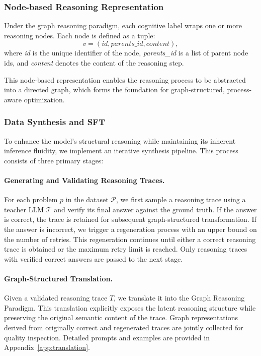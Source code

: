 \subsubsection{Node-based Reasoning Representation}
\label{sec:nodes}

Under the graph reasoning paradigm, each cognitive label wraps one or more reasoning nodes.
Each node is defined as a tuple:
\begin{equation}
v = (\textit{id}, \textit{parents\_id}, \textit{content}),
\end{equation}
where \textit{id} is the unique identifier of the node, \textit{parents\_id} is a list of parent node ids, and \textit{content} denotes the content of the reasoning step.

This node-based representation enables the reasoning process to be abstracted into a directed graph, which forms the foundation for graph-structured, process-aware optimization.

\subsubsection{Data Synthesis and SFT}
\label{sec:data_sft}


To enhance the model's structural reasoning while maintaining its inherent inference fluidity, we implement an iterative synthesis pipeline. This process consists of three primary stages:

\paragraph{Generating and Validating Reasoning Traces.}
For each problem $p$ in the dataset $\mathcal{P}$, we first sample a reasoning trace using a teacher LLM $\mathcal{T}$ and verify its final answer against the ground truth.
If the answer is correct, the trace is retained for subsequent graph-structured transformation.
If the answer is incorrect, we trigger a regeneration process with an upper bound on the number of retries.
This regeneration continues until either a correct reasoning trace is obtained or the maximum retry limit is reached.
Only reasoning traces with verified correct answers are passed to the next stage.

\paragraph{Graph-Structured Translation.}
Given a validated reasoning trace $T$, we translate it into the Graph Reasoning Paradigm. This translation explicitly exposes the latent reasoning structure while preserving the original semantic content of the trace.
Graph representations derived from originally correct and regenerated traces are jointly collected for quality inspection. Detailed prompts and examples are provided in Appendix~\ref{app:translation}.


